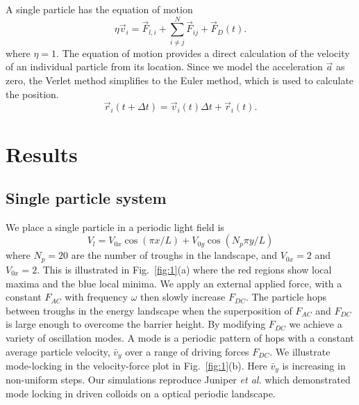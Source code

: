 \documentclass[prb,preprint]{revtex4}
\begin{document}
A single particle has the equation of motion 
\begin{equation}
\eta \vec{v}_i = \vec{F}_{l,i} + \sum_{i \neq j}^{N} \vec{F}_{ij} + \vec{F}_{D}(t).
\end{equation}
where $\eta = 1$.
The equation of motion provides a direct calculation of the velocity
of an individual particle from its location.
Since we model the acceleration $\vec{a}$ as zero,
the Verlet method simplifies to 
the Euler method,
which is used to calculate the position. %
\begin{equation}
\vec{r}_i(t+\Delta t) = \vec{v}_i(t) \Delta t + \vec{r}_i(t).
\end{equation} 




\section{Results}
\label{sec:results}

\subsection{Single particle system}
\label{sec:one}

We place a single particle in a periodic light field is
\begin{equation}
  V_l = V_{0x} \cos{(\pi x/L)} + V_{0y} \cos{(N_p \pi y / L)} 
\end{equation}
where $N_p=20$ are the number of troughs in the landscape,
and $V_{0x}=2$ and $V_{0x}=2$.
This is illustrated in Fig.~\ref{fig:1}(a) where
the red regions show local maxima and the blue local minima.
We apply an external applied force, 
with 
a constant $F_{AC}$ with frequency $\omega$ then slowly increase $F_{DC}$.
The particle hops between troughs in the energy landscape
when the superposition of $F_{AC}$ and $F_{DC}$ is large enough
to overcome the barrier height.
By modifying $F_{DC}$ we 
achieve a variety of oscillation modes.
A mode is a periodic pattern of hops
with a constant average particle velocity, $\bar{v}_{y}$
over a range of driving forces $F_{DC}$.
We illustrate mode-locking in 
the velocity-force plot in Fig.~\ref{fig:1}(b).
Here $\bar{v}_{y}$ is increasing in non-uniform steps.
Our simulations reproduce 
Juniper {\it et al.} \cite{juniper2015}
which demonstrated
mode locking in driven colloids on a
optical periodic landscape.
\end{document}
